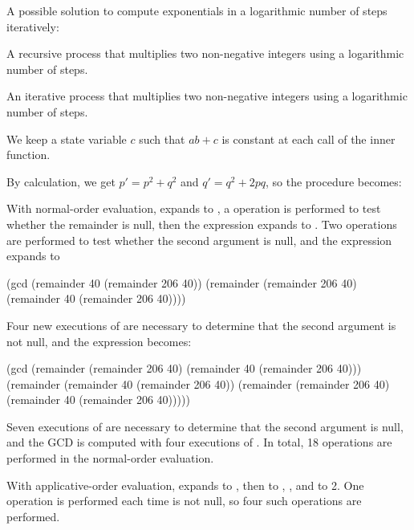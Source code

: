 \begin{exe}[1.16]
    A possible solution to compute exponentials in a logarithmic number of steps 
    iteratively:
\end{exe}

\begin{exe}[1.17]
    A recursive process that multiplies two non-negative integers using 
    a logarithmic number of steps.
\end{exe}

\begin{exe}[1.18]
    An iterative process that multiplies two non-negative integers using 
    a logarithmic number of steps.

    We keep a state variable $c$ such that $ab + c$ is constant at each call 
    of the inner function.
\end{exe}

\begin{exe}[1.19]
    By calculation, we get $p' = p^2 + q^2$ and $q' = q^2 + 2pq$, so the 
    procedure becomes:
\end{exe}

\begin{exe}[1.20]
    With normal-order evaluation,  expands to
    , a  operation is 
    performed to test whether the remainder is null, then the expression expands 
    to . Two 
     operations are performed to test whether the second 
    argument is null, and the expression expands to
    \begin{cscm}
        (gcd (remainder 40 (remainder 206 40))
             (remainder (remainder 206 40) (remainder 40 (remainder 206 40))))
    \end{cscm}
    Four new executions of  are necessary to determine that the 
    second argument is not null, and the expression becomes:
    \begin{cscm}
        (gcd (remainder (remainder 206 40) (remainder 40 (remainder 206 40)))
             (remainder (remainder 40 (remainder 206 40))
                        (remainder (remainder 206 40)
                                   (remainder 40 (remainder 206 40)))))
    \end{cscm}
    Seven executions of  are necessary to determine that the 
    second argument is null, and the GCD is computed with four executions of 
    . In total, 18  operations are performed in 
    the normal-order evaluation.

    \bigskip

    With applicative-order evaluation,  expands to
    , then to , ,
     and to 2. One  operation is performed each 
    time  is not null, so four such operations are performed.
\end{exe}

